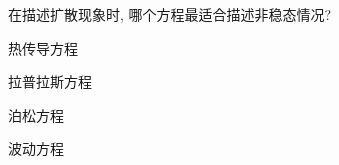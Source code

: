 \documentclass{njustexam}
\begin{document}








\begin{problem}
在描述扩散现象时, 哪个方程最适合描述非稳态情况? 
  \begin{abcd}
    \item 热传导方程
    \item 拉普拉斯方程   
    \item 泊松方程
    \item 波动方程
  \end{abcd}
\end{problem}



\end{document}
